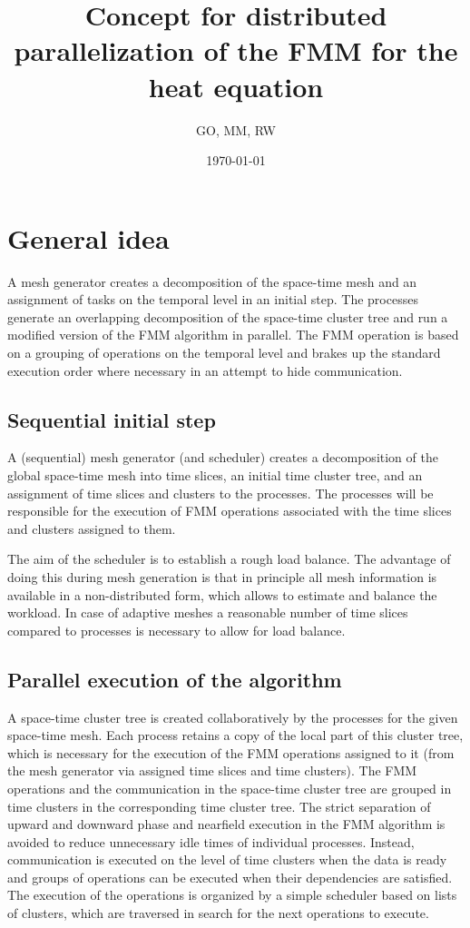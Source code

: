 \documentclass[a4paper,11pt]{article}
\title{\sffamily\bfseries Concept for distributed parallelization of the FMM for the heat equation}
\author{GO, MM, RW}
\date{\today}
\theoremstyle{plain}
\theoremstyle{definition}
\theoremstyle{remark}
\begin{document}
\maketitle

\section{General idea}
A mesh generator creates a decomposition of the space-time mesh and an assignment of tasks on the temporal level in an 
initial step. The processes generate an overlapping decomposition of the space-time cluster tree and run a modified 
version of the FMM algorithm in parallel. The FMM operation is based on a grouping of operations on the temporal level 
and brakes up the standard execution order where necessary in an attempt to hide communication.

\subsection{Sequential initial step}
A (sequential) mesh generator (and scheduler) creates a decomposition of the global space-time mesh into time slices, 
an initial time cluster tree, and an assignment of time slices and clusters to the processes. The processes will be 
responsible for the execution of FMM operations associated with the time slices and clusters assigned to them.

 The aim of the scheduler is to establish a rough load balance. The advantage of doing this during mesh generation is 
 that in principle all mesh information is available in a non-distributed form, which allows to estimate and balance 
 the workload. In case of adaptive meshes a reasonable number of time slices compared to processes is necessary to 
 allow for load balance.

\subsection{Parallel execution of the algorithm}

A space-time cluster tree is created collaboratively by the processes for the given space-time mesh. Each process
retains a copy of the local part of this cluster tree, which is necessary for the execution of the FMM operations 
assigned to it (from the mesh generator via assigned time slices and time clusters). The FMM operations and the
communication in the space-time cluster tree are grouped in time clusters in the corresponding time cluster tree. The 
strict separation of upward and downward phase and nearfield execution in the FMM algorithm is avoided to reduce 
unnecessary idle times of individual processes. Instead, communication is executed on the level of time clusters when 
the data is ready and groups of operations can be executed when their dependencies are satisfied. The execution of the operations is organized by a simple scheduler based on lists of clusters, which are traversed in search for the next operations to execute.
\end{document}
